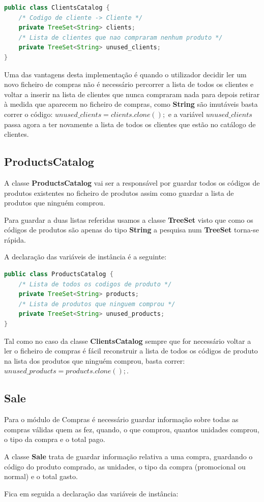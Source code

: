 \documentclass[10pt] {article}
\begin{document}
\begin{lstlisting}[language=Java]
public class ClientsCatalog {
	/* Codigo de cliente -> Cliente */
	private TreeSet<String> clients;
	/* Lista de clientes que nao compraram nenhum produto */
	private TreeSet<String> unused_clients;
}
\end{lstlisting}

\par Uma das vantagens desta implementação é quando o utilizador decidir ler um novo ficheiro de compras não é necessário
percorrer a lista de todos os clientes e voltar a inserir na lista de clientes que nunca compraram nada para depois retirar à
medida que aparecem no ficheiro de compras, como \textbf{String} são imutáveis basta correr o código:
$unused\_clients = clients.clone();$ e a variável $unused\_clients$ passa agora a ter novamente a lista de todos os clientes que estão no catálogo de clientes.

\subsection{ProductsCatalog}
\par A classe \textbf{ProductsCatalog} vai ser a responsável por guardar todos os códigos de produtos existentes no ficheiro de
produtos assim como guardar a lista de produtos que ninguém comprou.
\par Para guardar a duas listas referidas usamos a classe \textbf{TreeSet} visto que como os códigos de produtos são apenas
do tipo \textbf{String} a pesquisa num \textbf{TreeSet} torna-se rápida.
\par A declaração das variáveis de instância é a seguinte:

\begin{lstlisting}[language=Java]
public class ProductsCatalog {
	/* Lista de todos os codigos de produto */
	private TreeSet<String> products;
	/* Lista de produtos que ninguem comprou */
	private TreeSet<String> unused_products;
}
\end{lstlisting}

\par Tal como no caso da classe \textbf{ClientsCatalog} sempre que for necessário voltar a ler o ficheiro de compras é fácil
reconstruir a lista de todos os códigos de produto na lista dos produtos que ninguém comprou, basta correr:
$unused\_products = products.clone();$.

\newpage
\subsection{Sale}
\par Para o módulo de Compras é necessário guardar informação sobre todas as compras válidas quem as fez, quando,
o que comprou, quantos unidades comprou, o tipo da compra e o total pago.
\par A classe \textbf{Sale} trata de guardar informação relativa a uma compra, guardando o código do produto comprado,
as unidades, o tipo da compra (promocional ou normal) e o total gasto.
\par Fica em seguida a declaração das variáveis de instância:
\end{document}
